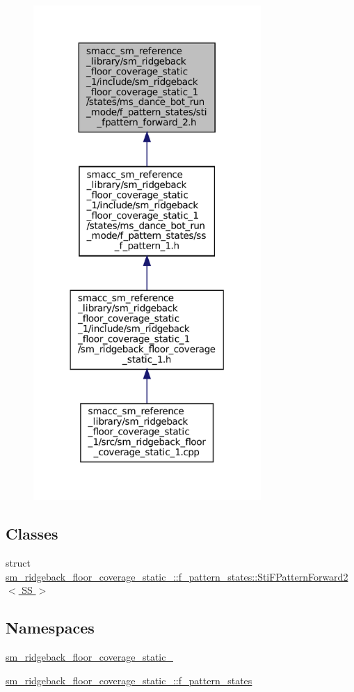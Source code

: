 \begin{figure}[H]
\begin{center}
\leavevmode
\includegraphics[width=245pt]{sm__ridgeback__floor__coverage__static__1_2include_2sm__ridgeback__floor__coverage__static__1_2s64e73957695cca842c084ad2e298ab1f}
\end{center}
\end{figure}
\subsection*{Classes}
\begin{DoxyCompactItemize}
\item 
struct \hyperlink{classsm__ridgeback__floor__coverage__static__1_1_1f__pattern__states_1_1StiFPatternForward2}{sm\+\_\+ridgeback\+\_\+floor\+\_\+coverage\+\_\+static\+\_\+::f\+\_\+pattern\+\_\+states\+::\+Sti\+F\+Pattern\+Forward2$<$ S\+S $>$}
\end{DoxyCompactItemize}
\subsection*{Namespaces}
\begin{DoxyCompactItemize}
\item 
 \hyperlink{namespacesm__ridgeback__floor__coverage__static__1}{sm\+\_\+ridgeback\+\_\+floor\+\_\+coverage\+\_\+static\+\_}
\item 
 \hyperlink{namespacesm__ridgeback__floor__coverage__static__1_1_1f__pattern__states}{sm\+\_\+ridgeback\+\_\+floor\+\_\+coverage\+\_\+static\+\_\+::f\+\_\+pattern\+\_\+states}
\end{DoxyCompactItemize}
